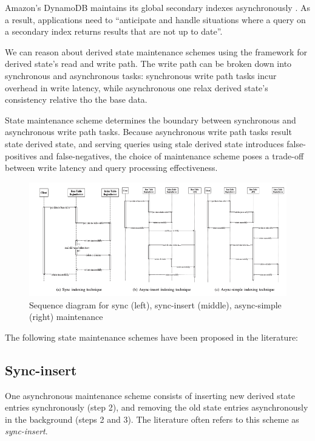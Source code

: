 Amazon's DynamoDB maintains its global secondary indexes asynchronously \cite{dynamodb:async}.
As a result,
applications need to ``anticipate and handle situations where a query on a secondary index returns results that are
not up to date''.


\bigskip

We can reason about derived state maintenance schemes using the framework for derived state's read and write path.
The write path can be broken down into synchronous and asynchronous tasks:
synchronous write path tasks incur overhead in write latency, while asynchronous one relax derived state's consistency
relative tho the base data.

State maintenance scheme determines the boundary between synchronous and asynchronous write path tasks.
Because asynchronous write path tasks result state derived state, and serving queries using stale derived state
introduces false-positives and false-negatives, the choice of maintenance scheme poses a trade-off between write latency
and query processing effectiveness.

\begin{figure}
  \centering

  \includegraphics[width=\textwidth]{./figures/design_space/maintenance.png}

  \caption{Sequence diagram for sync (left), sync-insert (middle), async-simple (right) maintenance}

  \label{fig:maintenance_schemes}

\end{figure}

\bigskip

The following state maintenance schemes have been proposed in the literature:

\subsection{Sync-insert}
One asynchronous maintenance scheme consists of inserting new derived state entries synchronously (step 2),
and removing the old state entries asynchronously in the background (steps 2 and 3).
The literature often refers to this scheme as \textit{sync-insert}.

